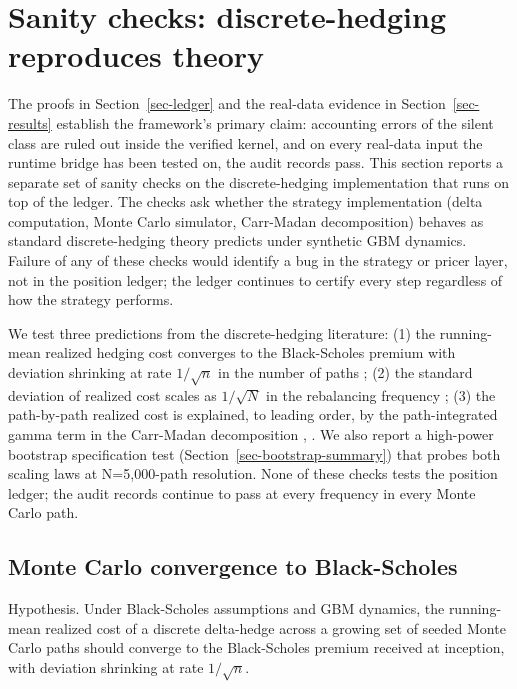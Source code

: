 \documentclass[
  11pt,
  letterpaper,
  DIV=12,
  numbers=noendperiod]{scrartcl}
\numberwithin{equation}{section}
\numberwithin{figure}{section}
\numberwithin{table}{section}
\let\quantproofsoldsection\section
\renewcommand{\section}{\clearpage\quantproofsoldsection}
\begin{document}
\section{Sanity checks: discrete-hedging reproduces
theory}\label{sec-sanity}

The proofs in Section~\ref{sec-ledger} and the real-data evidence in
Section~\ref{sec-results} establish the framework's primary claim:
accounting errors of the silent class are ruled out inside the verified
kernel, and on every real-data input the runtime bridge has been tested
on, the audit records pass. This section reports a separate set of
sanity checks on the discrete-hedging implementation that runs on top of
the ledger. The checks ask whether the strategy implementation (delta
computation, Monte Carlo simulator, Carr-Madan decomposition) behaves as
standard discrete-hedging theory predicts under synthetic GBM dynamics.
Failure of any of these checks would identify a bug in the strategy or
pricer layer, not in the position ledger; the ledger continues to
certify every step regardless of how the strategy performs.

We test three predictions from the discrete-hedging literature: (1) the
running-mean realized hedging cost converges to the Black-Scholes
premium with deviation shrinking at rate \(1/\sqrt{n}\) in the number of
paths ; (2)
the standard deviation of realized cost scales as \(1/\sqrt{N}\) in the
rebalancing frequency ; (3) the path-by-path realized cost is explained, to leading
order, by the path-integrated gamma term in the Carr-Madan decomposition
,
. We also report a
high-power bootstrap specification test
(Section~\ref{sec-bootstrap-summary}) that probes both scaling laws at
N=5,000-path resolution. None of these checks tests the position ledger;
the audit records continue to pass at every frequency in every Monte
Carlo path.

\subsection{Monte Carlo convergence to Black-Scholes}\label{sec-mc}

Hypothesis. Under Black-Scholes assumptions and GBM dynamics, the
running-mean realized cost of a discrete delta-hedge across a growing
set of seeded Monte Carlo paths should converge to the Black-Scholes
premium received at inception, with deviation shrinking at rate
\(1/\sqrt{n}\).
\end{document}
